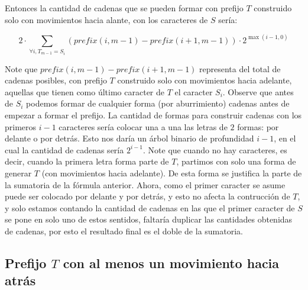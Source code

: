 \documentclass[a4paper]{article}
\begin{document}
    Entonces la cantidad de cadenas que se pueden formar con prefijo $T$ construido solo con
    movimientos hacia alante, con los caracteres de $S$ ser\'ia:

    \begin{equation} \label{eq:eq1}
        2 \cdot \sum_{\forall i, T_{m-1} = S_i} (prefix(i,m-1) - prefix(i+1,m-1)) \cdot 2^{\max(i-1,0)}
    \end{equation}


    Note que $prefix(i,m-1) - prefix(i+1,m-1)$ representa del total de cadenas posibles,
    con prefijo $T$ construido solo con movimientos hacia adelante, aquellas que tienen como
    \'ultimo caracter de $T$ el caracter $S_i$. Observe que antes de $S_{i}$ podemos formar
    de cualquier forma (por aburrimiento) cadenas antes de empezar a formar el prefijo.
    La cantidad de formas para construir cadenas con los primeros $i-1$ caracteres ser\'ia
    colocar una a una las letras de $2$ formas: por delante o por detr\'as. Esto nos dar\'ia
    un \'arbol binario de profundidad $i-1$, en el cual la cantidad de cadenas ser\'ia $2^{i-1}$.
    Note que cuando no hay caracteres, es decir, cuando la primera letra forma parte de $T$,
    partimos con solo una forma de generar $T$ (con movimientos hacia adelante).
    De esta forma se justifica la parte de la sumatoria de la f\'ormula anterior. Ahora, como 
    el primer caracter se asume puede ser colocado por delante y por detr\'as, y esto no afecta la contrucci\'on de $T$,
    y solo estamos contando la cantidad de cadenas en las que el primer caracter de $S$ se pone en solo uno de estos sentidos, faltar\'ia duplicar las 
    cantidades obtenidas de cadenas, por esto el resultado final es el doble de la sumatoria.

    \subsection*{Prefijo $T$ con al menos un movimiento hacia atr\'as}


\end{document}

